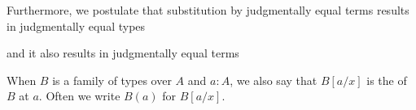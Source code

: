 \begin{enumerate}
\begin{prooftree}
\end{prooftree}
Furthermore, we postulate that substitution by judgmentally equal terms results in judgmentally equal types
\begin{prooftree}
\end{prooftree}
and it also results in judgmentally equal terms
\begin{prooftree}
\end{prooftree}
When $B$ is a family of types over $A$ and $a:A$, we also say that $B[a/x]$ is the  of $B$ at $a$. Often we write $B(a)$ for $B[a/x]$.
\end{enumerate}




